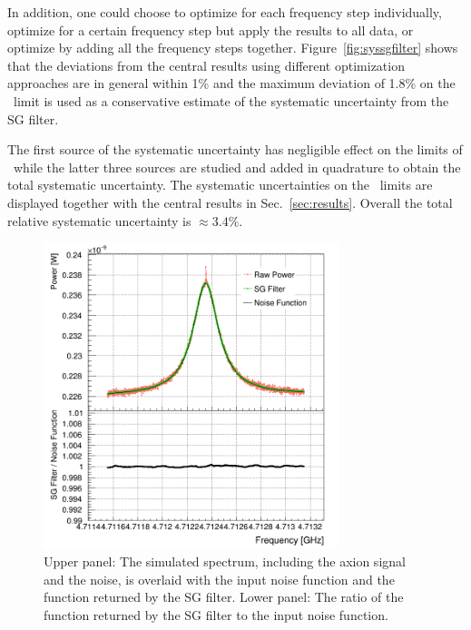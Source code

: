 \begin{itemize}
In addition, one could choose to optimize for each frequency step 
individually, optimize for a certain frequency step but apply the results to 
all data, or optimize by adding all the frequency steps together. 
Figure~\ref{fig:syssgfilter} shows that 
the deviations from the central results using different optimization 
approaches are in general within 1\% and the 
maximum deviation of 1.8\% 
on the \gagg\ limit is used as a conservative estimate of the systematic 
uncertainty from the SG filter. 

\end{itemize}

The first source of the systematic uncertainty 
has negligible effect on the limits of \gagg\ while the 
latter three sources are studied and added in quadrature to obtain the total 
systematic uncertainty. The systematic uncertainties on the \gagg\ limits 
are displayed together with the central results in Sec.~\ref{sec:results}. 
Overall the total relative systematic uncertainty is $\approx 3.4\%$.

\begin{figure} [htbp]
  \centering
  \includegraphics[width=8.6cm]{figures/GeneratedSpectrum_Optimized_SGFilter_NPar_3_Window_141.png}
  \caption{Upper panel: 
 The simulated spectrum, including the axion signal and the noise, 
 is overlaid with the input noise function and the function returned by 
 the SG filter. Lower panel: The ratio of the function returned by the SG 
 filter to the input noise function.}
  \label{fig:sgcompare}
\end{figure}


